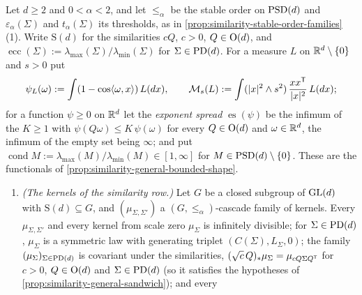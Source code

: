 \begin{proposition}
\label{prop:similarity-stable-order-kernels}
\leanok
Let $d \ge 2$ and $0 < \alpha < 2$, and let $\le_\alpha$ be the stable order on $\mathrm{PSD}(d)$ and
$\varepsilon_\alpha(\Sigma)$ and $t_\alpha(\Sigma)$ its thresholds, as in
\ref{prop:similarity-stable-order-families}(1). Write $\mathrm S(d)$ for the similarities $cQ$, $c > 0$,
$Q \in \mathrm{O}(d)$, and $\operatorname{ecc}(\Sigma) := \lambda_{\max}(\Sigma)/\lambda_{\min}(\Sigma)$ for
$\Sigma \in \mathrm{PD}(d)$. For a measure $L$ on $\mathbb{R}^d \setminus \{0\}$ and $s > 0$ put
\[
  \psi_L(\omega) := \int(1 - \cos\langle\omega,x\rangle)\,L(dx) ,
  \qquad
  \mathcal M_s(L) := \int(|x|^2 \wedge s^2)\,\frac{xx^{\mathsf{T}}}{|x|^2}\,L(dx) ;
\]
for a function $\psi \ge 0$ on $\mathbb{R}^d$ let the \emph{exponent spread} $\operatorname{es}(\psi)$ be the
infimum of the $K \ge 1$ with $\psi(Q\omega) \le K\,\psi(\omega)$ for every $Q \in \mathrm{O}(d)$ and
$\omega \in \mathbb{R}^d$, the infimum of the empty set being $\infty$; and put
$\operatorname{cond}M := \lambda_{\max}(M)/\lambda_{\min}(M) \in [1,\infty]$ for
$M \in \mathrm{PSD}(d) \setminus \{0\}$. These are the functionals of
\ref{prop:similarity-general-bounded-shape}.
\begin{enumerate}
\item \emph{(The kernels of the similarity row.)} Let $G$ be a closed subgroup of $\mathrm{GL}(d)$ with
$\mathrm S(d) \subseteq G$, and $(\mu_{\Sigma,\Sigma'})$ a $(G, \le_\alpha)$-cascade family of kernels.
Every $\mu_{\Sigma,\Sigma'}$ and every kernel from scale zero $\mu_\Sigma$ is infinitely divisible; for
$\Sigma \in \mathrm{PD}(d)$, $\mu_\Sigma$ is a symmetric law with generating triplet $(C(\Sigma), L_\Sigma, 0)$;
the family $(\mu_\Sigma)_{\Sigma \in \mathrm{PD}(d)}$ is covariant under the similarities,
$(\sqrt c\,Q)_*\mu_\Sigma = \mu_{cQ\Sigma Q^{\mathsf{T}}}$ for $c > 0$, $Q \in \mathrm{O}(d)$ and $\Sigma \in \mathrm{PD}(d)$
(so it satisfies the hypotheses of \ref{prop:similarity-general-sandwich}); and every

\end{enumerate}
\end{proposition}
